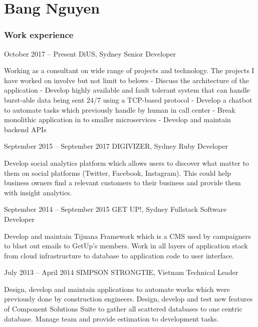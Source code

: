 \documentclass{tccv}
\begin{document}
\part{Bang Nguyen}

\section{Work experience}

\begin{eventlist}

\item{October 2017 -- Present}
    {DiUS, Sydney}
    {Senior Developer}

    Working as a consultant on wide range of projects and technology. The projects
    I have worked on involve but not limit to belows
    \newline- Discuss the architecture of the application
    \newline- Develop highly available and fault tolerant system that can handle burst-able data being sent 24/7 using a TCP-based protocol
    \newline- Develop a chatbot to automate tasks which previously handle by human in call center
    \newline- Break monolithic application in to smaller microservices
    \newline- Develop and maintain backend APIs

\item{September 2015 -- September 2017}
    {DIGIVIZER, Sydney}
    {Ruby Developer}

Develop social analytics platform which allows users to discover
what matter to them on social platforms (Twitter, Facebook, Instagram).
This could help business owners find a relevant customers
to their business and provide them with insight analytics.

\item{September 2014 -- September 2015}
    {GET UP!, Sydney}
    {Fullstack Software Developer}

Develop and maintain Tijuana Framework which is a CMS
used by campaigners to blast out emails to GetUp's members.
Work in all layers of application stack from cloud infrastructure
to database to application code to user interface.

\item{July 2013 -- April 2014}
    {SIMPSON STRONGTIE, Vietnam}
    {Technical Leader}

Design, develop and maintain applications to automate works which were previously done by construction engineers.
Design, develop and test new features of Component Solutions Suite to gather all scattered databases to one centric database.
Manage team and provide estimation to development tasks.


\end{eventlist}
\end{document}
